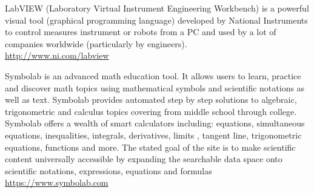 	{\Large {}}{\Large {}} LabVIEW (Laboratory Virtual Instrument Engineering Workbench) is a powerful visual tool (graphical programming language) developed by National Instruments to control measures instrument or robots from a PC and used by a lot of companies worldwide (particularly by engineers).\\
	\href{http://www.ni.com/labview}{\color{blue}http://www.ni.com/labview}
	
	{\Large {}}{\Large {}}{\Large {}} Symbolab is an advanced math education tool. It allows users to learn, practice and discover math topics using mathematical symbols and scientific notations as well as text. Symbolab provides automated step by step solutions to algebraic, trigonometric and calculus topics covering from middle school through college. Symbolab offers a wealth of smart calculators including: equations, simultaneous equations, inequalities, integrals, derivatives, limits , tangent line, trigonometric equations, functions and more. The stated goal of the site is to make scientific content universally accessible by expanding the searchable data space onto scientific notations, expressions, equations and formulas \\
	\href{https://www.symbolab.com}{\color{blue}https://www.symbolab.com}
	
